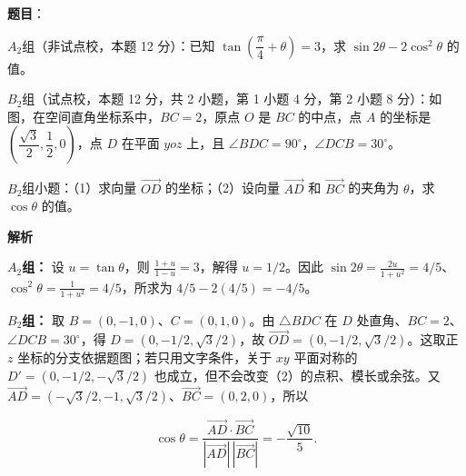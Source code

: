 \begin{answer}

\textbf{题目}：

$A_2$组（非试点校，本题 12 分）：已知 $\tan\left(\dfrac\pi4+\theta\right)=3$，求 $\sin2\theta-2\cos^2\theta$ 的值。

$B_2$组（试点校，本题 12 分，共 2 小题，第 1 小题 4 分，第 2 小题 8 分）：如图，在空间直角坐标系中，$BC=2$，原点 $O$ 是 $BC$ 的中点，点 $A$ 的坐标是 $\left(\dfrac{\sqrt3}{2},\dfrac12,0\right)$，点 $D$ 在平面 $yoz$ 上，且 $\angle BDC=90^\circ$，$\angle DCB=30^\circ$。
\nopagebreak[4]
\begin{center}\end{center}
\nopagebreak[4]
$B_2$组小题：（1）求向量 $\overrightarrow{OD}$ 的坐标；（2）设向量 $\overrightarrow{AD}$ 和 $\overrightarrow{BC}$ 的夹角为 $\theta$，求 $\cos\theta$ 的值。

\textbf{解析}

\textbf{$A_2$组：} 设 $u=\tan\theta$，则 $\frac{1+u}{1-u}=3$，解得 $u=1/2$。因此 $\sin2\theta=\frac{2u}{1+u^2}=4/5$、$\cos^2\theta=\frac1{1+u^2}=4/5$，所求为 $4/5-2(4/5)=-4/5$。

\textbf{$B_2$组：} 取 $B=(0,-1,0)$、$C=(0,1,0)$。由 $\triangle BDC$ 在 $D$ 处直角、$BC=2$、$\angle DCB=30^\circ$，得 $D=(0,-1/2,\sqrt3/2)$，故 $\overrightarrow{OD}=(0,-1/2,\sqrt3/2)$。这取正 $z$ 坐标的分支依据题图；若只用文字条件，关于 $xy$ 平面对称的 $D'=(0,-1/2,-\sqrt3/2)$ 也成立，但不会改变（2）的点积、模长或余弦。又 $\overrightarrow{AD}=(-\sqrt3/2,-1,\sqrt3/2)$、$\overrightarrow{BC}=(0,2,0)$，所以

\nopagebreak[4]
\[\cos\theta=\frac{\overrightarrow{AD}\cdot\overrightarrow{BC}}{|\overrightarrow{AD}|\,|\overrightarrow{BC}|}=-\frac{\sqrt{10}}5.\]


\end{answer}

